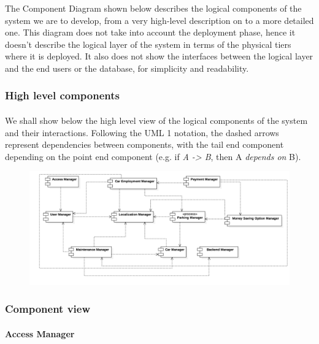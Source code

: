 The Component Diagram shown below describes the logical components of the system we are to develop, from a very high-level description on to a more detailed one. This diagram does not take into account the deployment phase, hence it doesn't describe the logical layer of the system in terms of the physical tiers where it is deployed. It also does not show the interfaces between the logical layer and the end users or the database, for simplicity and readability. 


	\subsubsection{High level components}
		\paragraph{} We shall show below the high level view of the logical components of the system and their interactions. Following the UML 1 notation, the dashed arrows represent dependencies between components, with the tail end component depending on the point end component (e.g. if \textit{A -> B}, then A \textit{depends on} B). 

		
		\begin{figure}[h]
			\includegraphics[scale=0.24]{img/component_diagrams/01_high_level_component_view.png}
		\end{figure}
\FloatBarrier


	\subsubsection{Component view}
	
	
	
		\paragraph{Access Manager}
		
